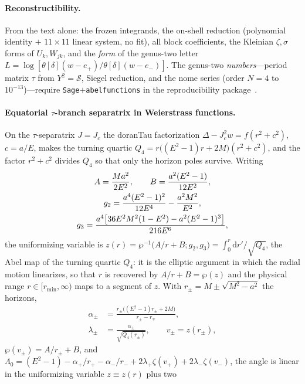 \documentclass[
    aps, prd, twocolumn, superscriptaddress,
    showpacs, nofootinbib, floatfix
]{revtex4-2}
\newcommand{\Jc}{J_{c}}
\newcommand{\dd}{\mathrm{d}}
\begin{document}
\paragraph{Reconstructibility.} From the text alone: the frozen integrands, the
on-shell reduction (polynomial identity $+$ $11\times11$ linear system, no fit), all
block coefficients, the Kleinian $\zeta,\sigma$ forms of $U_k,W_{jk}$, and the
\emph{form} of the genus-two letter $L=\log[\theta[\delta](w-e_+)/\theta[\delta](w-e_-)]$.
The genus-two \emph{numbers}---period matrix $\tau$ from $Y^2=\mathcal S$, Siegel
reduction, and the nome series (order $N{=}4$ to $10^{-13}$)---require
\texttt{Sage}$+$\texttt{abelfunctions} in the reproducibility
package~\cite{Rosignoli2026Code}.

\paragraph{Equatorial $\tau$-branch separatrix in Weierstrass functions.} On the
$\tau$-separatrix $J=\Jc$ the doranTau factorization $\Delta-\Jc^2 w=f(r^2+c^2)$,
$c=a/E$, makes the
turning quartic $Q_4=r\big((E^2-1)r+2M\big)(r^2+c^2)$, and the factor $r^2+c^2$
divides $Q_4$ so that only the horizon poles survive. Writing
\begin{gather}
    A=\frac{Ma^2}{2E^2},\qquad B=\frac{a^2(E^2-1)}{12E^2},\notag\\
    g_2=\frac{a^4(E^2-1)^2}{12E^4}-\frac{a^2M^2}{E^2},\notag\\
    g_3=\frac{a^4\big[36E^2M^2(1-E^2)-a^2(E^2-1)^3\big]}{216E^6},
    \label{eq:wp-invariants}
\end{gather}
the uniformizing variable is $z(r)=\wp^{-1}\!\big(A/r+B;g_2,g_3\big)
=\int_0^r\dd r'/\sqrt{Q_4}$, the Abel map of the turning quartic $Q_4$: it is the
elliptic argument in which the radial motion linearizes, so that $r$ is recovered
by $A/r+B=\wp(z)$ and the physical range $r\in[r_{\min},\infty)$ maps to a
segment of $z$. With $r_\pm=M\pm\sqrt{M^2-a^2}$ the horizons,
\begin{equation}
\begin{aligned}
    \alpha_\pm&=\frac{r_\pm\big((E^2-1)r_\pm+2M\big)}{r_\pm-r_\mp},\\
    \lambda_\pm&=\frac{\alpha_\pm}{\sqrt{Q_4(r_\pm)}},\qquad v_\pm=z(r_\pm),
\end{aligned}
\end{equation}
$\wp(v_\pm)=A/r_\pm+B$, and
$\Lambda_0=(E^2-1)-\alpha_+/r_+-\alpha_-/r_-+2\lambda_+\zeta(v_+)+2\lambda_-\zeta(v_-)$,
the angle is linear in the uniformizing variable $z\equiv z(r)$ plus two
\end{document}
